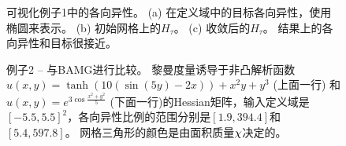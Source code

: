 \begin{table}[h]
\caption{例子1 -- 网格质量，与ODT, Zhong等的基于粒子(particle)的方法\cite{Zhong2013}，和Chen的局部区域(local patch)方法进行比较。为了公平起见，\cite{Zhong2013}的基于粒子的方法中使用了不同的参数进行比较。
$E_{max}$ 代表在所有三角形上的最大ODT误差： $\max_{\tau\in\mT} \int_{\tau} |\hat{u}(\mx) - u(\mx)| \, \mathrm{d} \mx$，越低越好。加粗的字代表实验中的最优值。}
\centering {}
\label{tab:exp}
\vspace{-3mm}
\end{table}

\begin{figure}[t]
\centerline
{
}
\vspace{-2mm}
\caption{可视化例子1中的各向异性。 (a) 在定义域中的目标各向异性，使用椭圆来表示。 (b) 初始网格上的$H_\tau$。 (c) 收敛后的$H_\tau$。 结果上的各向异性和目标很接近。}
\label{fig:2daniso}
\vspace{-3mm}
\end{figure}

\begin{figure}[!h]
\centerline
{
}
\centerline
{
}
\caption{例子2 -- 与BAMG进行比较。 黎曼度量诱导于非凸解析函数$u(x,y) = \tanh( 10(\sin(5y) -2x)) + x^2 y + y^3$ (上面一行) 和$u(x,y) = e^{3\cos \frac{x^2+y^2}{5}}$ (下面一行)的Hessian矩阵，输入定义域是$[-5.5,5.5]^2$，各向异性比例的范围分别是$[1.9,394.4]$和 $[5.4,597.8]$。 网格三角形的颜色是由面积质量$\chi$决定的。
}\label{fig:tanh}
\vspace{-3mm}
\end{figure}

